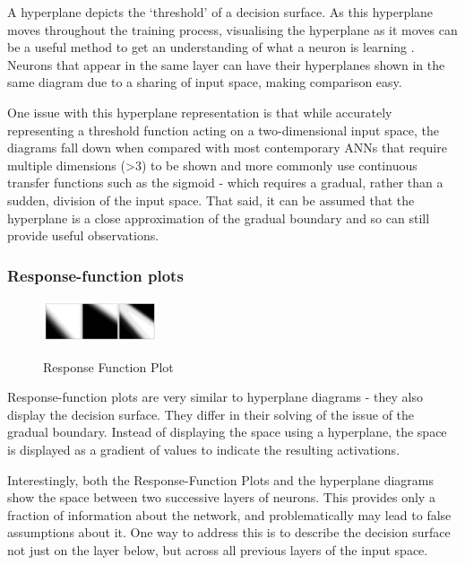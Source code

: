 \documentclass[a4paper,11pt,titlepage]{article}
\begin{document}
		A hyperplane depicts the `threshold' of a decision surface. As this hyperplane moves throughout the training process, visualising the hyperplane as it moves can be a useful method to get an understanding of what a neuron is learning \cite{Munro1992}. Neurons that appear in the same layer can have their hyperplanes shown in the same diagram due to a sharing of input space, making comparison easy.
		\par 
		One issue with this hyperplane representation is that while accurately representing a threshold function acting on a two-dimensional input space, the diagrams fall down when compared with most contemporary ANNs that require multiple dimensions (>3) to be shown and more commonly use continuous transfer functions such as  the sigmoid - which requires a gradual, rather than a sudden, division of the input space. That said, it can be assumed that the hyperplane is a close approximation of the gradual boundary and so can still provide useful observations.
		\par 
		
\subsubsection{Response-function plots}
		
 	\begin{figure}[H]
    			\centering	
			{{\includegraphics[width=0.3\textwidth]
    				{img/craven_gradient.png} 
    			}}%
    			\caption{Response Function Plot}%
    		\label{fig:bond}
	\end{figure} 
 		
		Response-function plots are very similar to hyperplane diagrams - they also display the decision surface. They differ in their solving of the issue of the gradual boundary. Instead of displaying the space using a hyperplane, the space is displayed as a gradient of values to indicate the resulting activations.
		\par 
		Interestingly, both the Response-Function Plots and the hyperplane diagrams show the space between two successive layers of neurons. This provides only a fraction of information about the network, and problematically may lead to false assumptions about it. One way to address this is to describe the decision surface not just on the layer below, but across all previous layers of the input space.
		\par 
		
\end{document}
